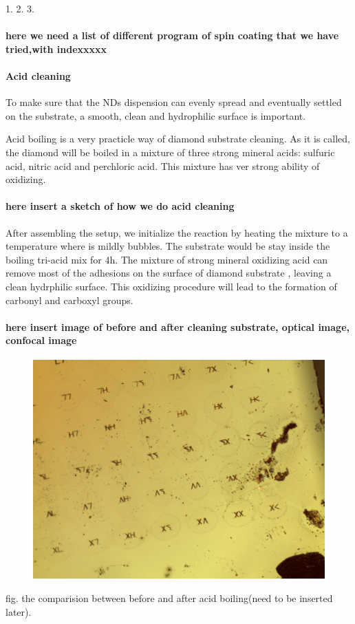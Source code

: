 1. 
2.
3.

\paragraph{here we need a list of different program of spin coating that we have tried,with indexxxxx}

\paragraph{Acid cleaning}
To make sure that the NDs dispension can evenly spread and eventually settled on the substrate, a smooth, clean and hydrophilic surface is important.

Acid boiling is a very practicle way of diamond substrate cleaning. As it is called, the diamond will be boiled in a mixture of three strong mineral acids: sulfuric acid, nitric acid and perchloric acid. This mixture has ver strong ability of oxidizing.

\paragraph{here insert a sketch of how we do acid cleaning} 

After assembling the setup, we initialize the reaction by heating the mixture to a temperature where is mildly bubbles. The substrate would be stay inside the boiling tri-acid mix for 4h. 
The mixture of strong mineral oxidizing acid can remove most of the adhesions on the surface of diamond substrate , leaving a clean hydrphilic surface. This oxidizing procedure will lead to the formation of carbonyl and carboxyl groups.




\paragraph {here insert image of before and after cleaning substrate, optical image, confocal image }
\FloatBarrier
\begin{figure}[h]
\centering
\includegraphics[width=0.7\linewidth]{Figures/pic/image470}
\caption{}
\label{fig:image470}
\end{figure}
\FloatBarrier
fig. the comparision between before and after acid boiling(need to be inserted later).
 

